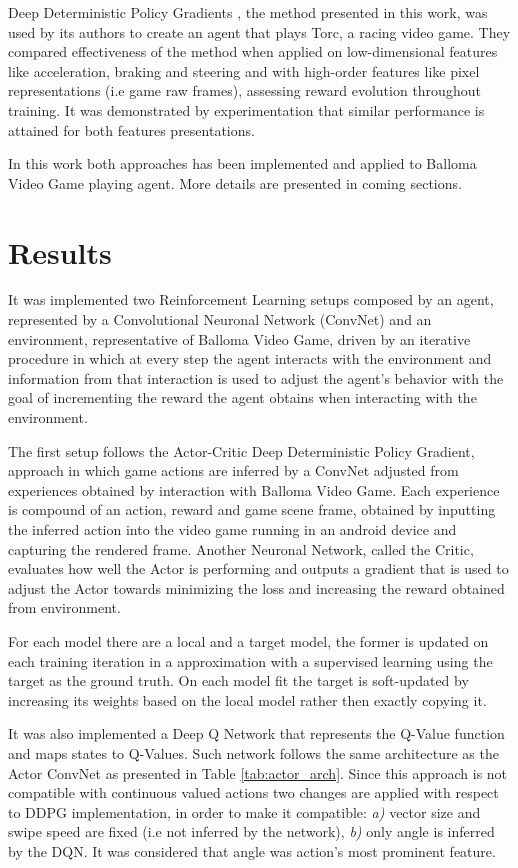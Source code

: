 \documentclass[peerreview,onecolumn]{IEEEtran}
\begin{document}
	  Deep Deterministic Policy Gradients \cite{ddpg_2015}, the method presented in this work, was used by its authors to create an agent that plays Torc, a racing video game. They compared effectiveness of the method when applied on low-dimensional features like acceleration, braking and steering and with high-order features like pixel representations (i.e game raw frames), assessing reward evolution throughout training. It was demonstrated by experimentation that similar performance is attained for both features presentations.

	In this work both approaches has been implemented and applied to Balloma Video Game playing agent. More details are presented in coming sections.
	  
	  \section{Results}
	  
	  It was implemented two Reinforcement Learning setups composed by an agent, represented by a Convolutional Neuronal Network (ConvNet) and an environment, representative of Balloma Video Game, driven by an iterative procedure in which at every step the agent interacts with the environment and information from that interaction is used to adjust the agent's behavior with the goal of incrementing the reward the agent obtains when interacting with the environment. 
	  
	 The first setup follows the Actor-Critic Deep Deterministic Policy Gradient, approach in which game actions are inferred by a ConvNet adjusted from experiences obtained by interaction with Balloma Video Game. Each experience is compound of an action, reward and game scene frame, obtained by inputting the inferred action into the video game running in an android device and capturing the rendered frame. Another Neuronal Network, called the Critic, evaluates how well the Actor is performing and outputs a gradient that is used to adjust the Actor towards minimizing the loss and increasing the reward obtained from environment.
	 
	 For each model there are a local and a target model, the former is updated on each training iteration in a approximation with a supervised learning using the target as the ground truth. On each model fit the target is soft-updated by increasing its weights based on the local model rather then exactly copying it.
	 
	 It was also implemented a Deep Q Network \cite{deep_q_n} that represents the Q-Value function and maps states to Q-Values. Such network follows the same architecture as the Actor ConvNet as presented in Table \ref{tab:actor_arch}. Since this approach is not compatible with continuous valued actions two changes are applied with respect to DDPG implementation, in order to make it compatible: \textit{a)} vector size and swipe speed are fixed (i.e not inferred by the network), \textit{b)} only angle is inferred by the DQN. It was considered that angle was action's most prominent feature.  
	 
\end{document}
